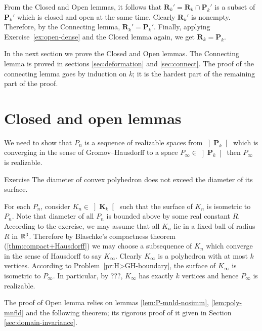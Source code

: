 From the Closed and Open lemmas, 
it follows that  $\mathbf{R}_k'=\mathbf{R}_k\cap \mathbf{P}_k'$ is a subset of $\mathbf{P}_{k}'$ which is closed and open at the same time.
Clearly $\mathbf{R}_k'$ is nonempty.
Therefore, by the Connecting lemma, $\mathbf{R}_k'=\mathbf{P}_{k}'$.
Finally, applying Exercise~\ref{ex:open-dense} and the Closed lemma again, we get $\mathbf{R}_k=\mathbf{P}_{k}$.
\qeds

In the next section we prove the Closed and Open lemmas.
The Connecting lemma is proved in sections \ref{sec:deformation} and \ref{sec:connect}.
The proof of the connecting lemma goes by induction on $k$;
it is the hardest part of the remaining part of the proof.








\section{Closed and open lemmas}\label{closed+open}

We need to  show that $P_n$ 
is a sequence of realizable spaces from $\left]\mathbf{P}_k\right[$
which is converging in the sense of Gromov--Hausdorff to a space $P_\infty\in \left]\mathbf{P}_k\right[$
then $P_\infty$ is realizable.

\begin{thm}{Exercise}
The diameter of convex polyhedron does not exceed the diameter of its surface.
\end{thm}

For each $P_n$, consider $K_n\in \left]\mathbf{K}_k\right[$
such that the surface of $K_n$ is isometric to $P_n$.
Note that diameter of all $P_n$ is bounded above by some real constant $R$.
According to the exercise, 
we may assume that all $K_n$ lie in a fixed ball of radius $R$ in $\mathbb{R}^3$.
Therefore by Blaschke's compactness theorem (\ref{thm:compact+Hausdorff}) we may choose a subsequence of $K_n$
which converge in the sense of Hausdorff to say $K_\infty$.
Clearly $K_\infty$ is a polyhedron with at most $k$ vertices.
According to Problem~\ref{pr:H>GH-boundary}, the surface of $K_\infty$ is isometric to $P_\infty$. 
In particular, by ???, $K_\infty$ has exactly $k$ vertices and hence $P_\infty$ is realizable.
\qeds

The proof of Open lemma relies on lemmas \ref{lem:P-mnld-nosimm}, \ref{lem:poly-mnfld}
and the following theorem;
its rigorous proof of it given in Section \ref{sec:domain-invariance}.


